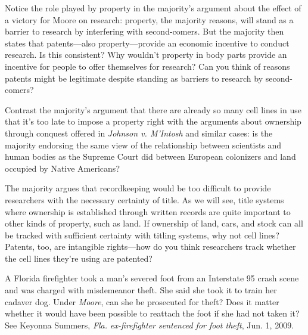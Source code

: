 \item Notice the role played by property in the majority's argument about the
effect of a victory for Moore on research: property, the majority reasons, will
stand as a barrier to research by interfering with second-comers. But the
majority then states that patents---also property---provide an economic
incentive to conduct research.  Is this consistent?  Why wouldn't property in
body parts provide an incentive for people to offer themselves for research?
Can you think of reasons patents might be legitimate despite standing as
barriers to research by second-comers?

Contrast the majority's argument that there are already so many cell lines in
use that it's too late to impose a property right with the arguments about
ownership through conquest offered in \textit{Johnson v. M'Intosh} and similar
cases: is the majority endorsing the same view of the relationship between
scientists and human bodies as the Supreme Court did between European
colonizers and land occupied by Native Americans?

The majority argues that recordkeeping would be too difficult to provide
researchers with the necessary certainty of title.  As we will see, title
systems where ownership is established through written records are quite
important to other kinds of property, such as land.  If ownership of land,
cars, and stock can all be tracked with sufficient certainty with titling
systems, why not cell lines?  Patents, too, are intangible rights---how do you
think researchers track whether the cell lines they're using are patented?

\item A Florida firefighter took a man's severed foot from an Interstate 95
crash
scene and was charged with misdemeanor theft.  She said she took it to train
her cadaver dog.  Under \textit{Moore}, can she be prosecuted for theft?  Does
it matter whether it would have been possible to reattach the foot if she had
not taken it?  See Keyonna Summers,
\emph{Fla.
ex-firefighter sentenced for foot theft}, Jun. 1, 2009. 

